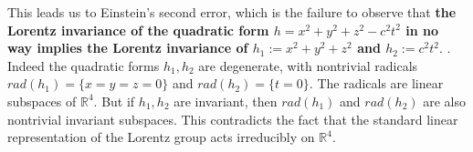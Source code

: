 \documentclass[12pt]{article}
\newtheorem*{thm}{Theorem}
\newcommand{\bR}{\mathbb{R}}
\newcommand{\del}{\partial}
\newcommand{\sC}{\mathscr{C}}
\begin{document}
This leads us to Einstein's second error, which is the failure to observe that \textbf{the Lorentz invariance of the quadratic form $h=x^2+y^2+z^2-c^2t^2$ in no way implies the Lorentz invariance of $h_1:=x^2+y^2+z^2$ and $h_2:=c^2 t^2.$ }. Indeed the quadratic forms $h_1, h_2$ are degenerate, with nontrivial radicals $rad(h_1)=\{x=y=z=0\}$ and $rad(h_2)=\{t=0\}.$ The radicals are linear subspaces of $\bR^4$. But if $h_1, h_2$ are invariant, then $rad(h_1)$ and $rad(h_2)$ are also nontrivial invariant subspaces. This contradicts the fact that the standard linear representation of the Lorentz group acts irreducibly on $\bR^4$.
















\end{document}
